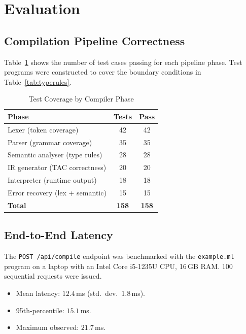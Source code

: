\documentclass[conference]{IEEEtran}
\begin{document}
\section{Evaluation}
\label{sec:eval}

\subsection{Compilation Pipeline Correctness}

Table~\ref{tab:correctness} shows the number of test cases passing
for each pipeline phase. Test programs were constructed to cover the
boundary conditions in Table~\ref{tab:typerules}.

\begin{table}[htbp]
\caption{Test Coverage by Compiler Phase}
\label{tab:correctness}
\centering
\renewcommand{\arraystretch}{1.2}
\begin{tabular}{@{}lcc@{}}
\toprule
\textbf{Phase} & \textbf{Tests} & \textbf{Pass} \\
\midrule
Lexer (token coverage)          & 42 & 42 \\
Parser (grammar coverage)       & 35 & 35 \\
Semantic analyser (type rules)  & 28 & 28 \\
IR generator (TAC correctness)  & 20 & 20 \\
Interpreter (runtime output)    & 18 & 18 \\
Error recovery (lex + semantic) & 15 & 15 \\
\midrule
\textbf{Total}                  & \textbf{158} & \textbf{158} \\
\bottomrule
\end{tabular}
\end{table}

\subsection{End-to-End Latency}

The \texttt{POST /api/compile} endpoint was benchmarked with the
\texttt{example.ml} program on a laptop with an Intel Core i5-1235U
CPU, 16\,GB RAM. 100 sequential requests were issued.

\begin{itemize}
  \item Mean latency: $\mathbf{12.4}$\,ms (std.\ dev.\ 1.8\,ms).
  \item 95th-percentile: $\mathbf{15.1}$\,ms.
  \item Maximum observed: $\mathbf{21.7}$\,ms.
\end{itemize}
\end{document}
